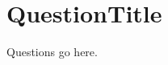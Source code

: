 \documentclass[10pt]{article}
\newcommand{\questiontitle}{QuestionTitle}
\begin{document}
%
%
\section*{\questiontitle}
Questions go here.
\end{document}
